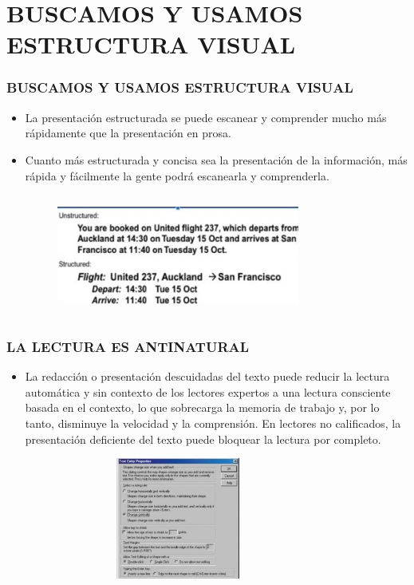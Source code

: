 \documentclass[11pt]{beamer}
\begin{document}
\section{BUSCAMOS Y USAMOS ESTRUCTURA VISUAL}
\begin{frame}
\frametitle{BUSCAMOS Y USAMOS ESTRUCTURA VISUAL}
\begin{itemize}
\item La presentación estructurada se puede escanear y comprender mucho más rápidamente que la presentación en prosa.
\item Cuanto más estructurada y concisa sea la presentación de la información, más rápida y fácilmente la gente podrá escanearla y comprenderla.

\begin{figure}[t]
\includegraphics[width=8cm, height=4cm]{Estructura.jpg}
\centering
\end{figure}
\end{itemize}
\end{frame}



\begin{frame}
\frametitle{LA LECTURA ES ANTINATURAL}
\begin{itemize}
\item La redacción o presentación descuidadas del texto puede reducir la lectura automática y sin contexto de los lectores expertos a una lectura consciente basada en el contexto, lo que sobrecarga la memoria de trabajo y, por lo tanto, disminuye la velocidad y la comprensión. En lectores no calificados, la presentación deficiente del texto puede bloquear la lectura por completo.

\begin{figure}[t]
\includegraphics[width=8cm, height=4cm]{data.jpg}
\centering
\end{figure}
\end{itemize}
\end{frame}
\end{document}
